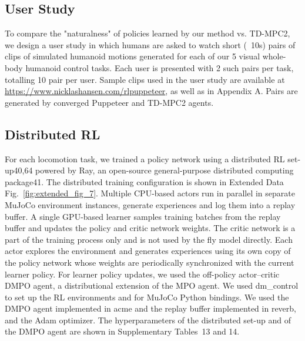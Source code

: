 \documentclass[sn-mathphys-num]{sn-jnl}%
\theoremstyle{thmstyleone}%
\theoremstyle{thmstyletwo}%
\theoremstyle{thmstylethree}%
\begin{document}
\subsection{User Study}

To compare the "naturalness" of policies learned by our method vs. TD-MPC2, 
we design a user study in which humans are asked to watch short (~10s) pairs of clips of simulated humanoid motions generated for each of our 5 visual whole-body humanoid control tasks.
Each user is presented with 2 such pairs per task, totalling 10 pair per user.
Sample clips used in the user study are available at \href{https://www.nicklashansen.com/rlpuppeteer}{https://www.nicklashansen.com/rlpuppeteer}, as well as in Appendix A.
Pairs are generated by converged Puppeteer and TD-MPC2 agents.



\subsection{Distributed RL}


For each locomotion task, we trained a policy network using a distributed RL set-up40,64 powered by Ray, an open-source general-purpose distributed computing package41. 
The distributed training configuration is shown in Extended Data Fig.~\ref{fig:extended_fig_7}. 
Multiple CPU-based actors run in parallel in separate MuJoCo environment instances, generate experiences and log them into a replay buffer. 
A single GPU-based learner samples training batches from the replay buffer and updates the policy and critic network weights. 
The critic network is a part of the training process only and is not used by the fly model directly. 
Each actor explores the environment and generates experiences using its own copy of the policy network whose weights are periodically synchronized with the current learner policy. 
For learner policy updates, we used the off-policy actor–critic DMPO agent, a distributional extension\cite{bellemare2017distributional} of the MPO agent\cite{abdolmaleki2018relative,abdolmaleki2018maximum}. 
We used dm\_control\cite{tunyasuvunakool2020dm_control} to set up the RL environments and for MuJoCo Python bindings. 
We used the DMPO agent implemented in acme\cite{hoffman2020acme} and the replay buffer implemented in reverb\cite{cassirer2021reverb}, and the Adam optimizer\cite{kingma2014adam}. 
The hyperparameters of the distributed set-up and of the DMPO agent are shown in Supplementary Tables 13 and 14.
\end{document}
